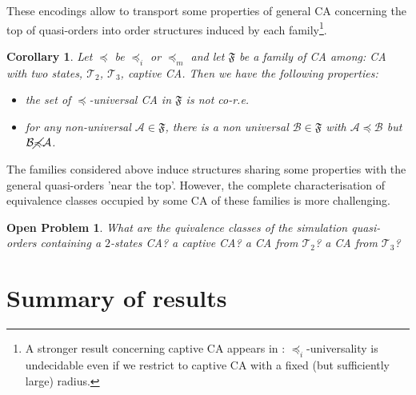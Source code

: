 \documentclass[a4paper]{elsarticle}
\def\qed{\relax\ifmmode\hskip2em \blacksquare\else\unskip\nobreak\hfill\hskip1em $\blacksquare$\fi}
\newcommand{\ACA}{\mathcal{A}}
\newcommand{\ACB}{\mathcal{B}}
\newcommand{\simu}{\preccurlyeq}
\newcommand{\sacsimu}{\simu_i}
\newcommand{\facsacsimu}{\simu_m}
\newcommand\equipt{\mathcal{T}_2}
\newcommand\sensi{\mathcal{T}_3}
\newcommand\fami{\mathfrak{F}}
\newtheorem{openpb}{Open Problem}
\newtheorem{cor}{Corollary}[section]
\begin{document}
These encodings allow to transport some properties of general CA
concerning the top of quasi-orders into order structures induced by
each family\footnote{A stronger result concerning captive CA appears
  in \cite{Theyssier05}: $\sacsimu$-universality is undecidable even if
  we restrict to captive CA with a fixed (but sufficiently large)
  radius.}.

\begin{cor}
  Let $\simu$ be $\sacsimu$ or $\facsacsimu$ and let $\fami$ be a
  family of CA among: CA with two states, $\equipt$, $\sensi$, captive
  CA.  Then we have the following properties:
  \begin{itemize}
  \item the set of $\simu$-universal CA in $\fami$ is not co-r.e.
  \item for any non-universal $\ACA\in\fami$, there is a non universal
    $\ACB\in\fami$ with ${\ACA\simu\ACB}$ but ${\ACB\cancel\simu\ACA}$.
  \end{itemize}
\end{cor}

The families considered above induce structures sharing some
properties with the general quasi-orders 'near the top'. However, the
complete characterisation of equivalence classes occupied by some CA
of these families is more challenging.

\begin{openpb}
  What are the quivalence classes of the simulation quasi-orders
  containing a $2$-states CA? a captive CA? a CA from $\equipt$? a CA
  from $\sensi$?
\end{openpb}

\section{Summary of results}
\end{document}
